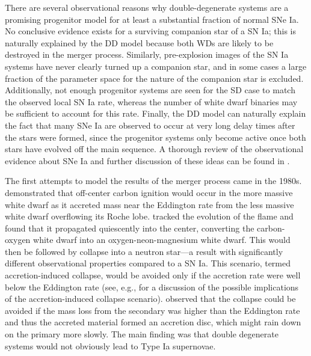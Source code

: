 \documentclass[iop,numberedappendix]{../emulateapj}
\begin{document}
There are several observational reasons why double-degenerate systems
are a promising progenitor model for at least a substantial fraction
of normal SNe Ia. No conclusive evidence exists for a surviving
companion star of a SN Ia; this is naturally explained by the DD model
because both WDs are likely to be destroyed in the merger
process. Similarly, pre-explosion images of the SN Ia systems have
never clearly turned up a companion star, and in some cases a large
fraction of the parameter space for the nature of the companion star
is excluded. Additionally, not enough progenitor systems are seen for
the SD case to match the observed local SN Ia rate, whereas the number
of white dwarf binaries may be sufficient to account for this
rate. Finally, the DD model can naturally explain the fact that many
SNe Ia are observed to occur at very long delay times after the stars
were formed, since the progenitor systems only become active once both
stars have evolved off the main sequence. A thorough review of the
observational evidence about SNe Ia and further discussion of these
ideas can be found in \cite{maoz:2014}.

The first attempts to model the results of the merger process came in the
1980s. \cite{nomotoiben:1985} demonstrated that off-center carbon
ignition would occur in the more massive white dwarf as it accreted
mass near the Eddington rate from the less massive white dwarf
overflowing its Roche lobe. \cite{saionomoto:1985} tracked the
evolution of the flame and found that it propagated quiescently into
the center, converting the carbon-oxygen white dwarf into an
oxygen-neon-magnesium white dwarf. This would then be followed by
collapse into a neutron star---a result with significantly different
observational properties compared to a SN Ia. This scenario, termed
accretion-induced collapse, would be avoided only if the accretion
rate were well below the Eddington rate (see, e.g., \cite{fryer:1999}
for a discussion of the possible implications of the accretion-induced 
collapse scenario). \cite{tutukov_yungelson:1979}
observed that the collapse could be avoided if the mass loss from the secondary
was higher than the Eddington rate and thus the accreted material
formed an accretion disc, which might rain down on the primary more
slowly. The main finding was that double degenerate systems would not
obviously lead to Type Ia supernovae.
\end{document}
